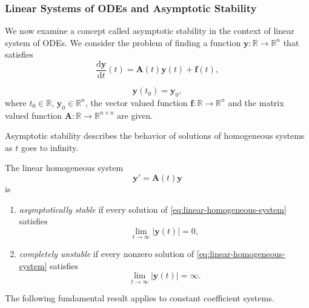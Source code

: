 \subsubsection{Linear Systems of ODEs and Asymptotic Stability}\label{subsec:linear-asymptotic-stability}

We now examine a concept called asymptotic stability in the context of linear system of ODEs. We consider the problem of finding a function $\bm{y}:\mathbb{R}\to\mathbb{R}^n$ that satisfies
\begin{equation}\label{eq:linear-nonhomogeneous-system}
\dfrac{\mathrm{d}\bm{y}}{\mathrm{d}t}(t)=\bm{A}(t)\bm{y}(t)+\bm{f}(t),
\end{equation}

\begin{equation}\label{eq:linear-system-initial-data}
\bm{y}(t_0)=\bm{y}_0,
\end{equation}
where $t_0\in\mathbb{R}$, $\bm{y}_0\in\mathbb{R}^n$, the vector valued function $\bm{f}:\mathbb{R}\to\mathbb{R}^n$ and the matrix valued function $\bm{A}:\mathbb{R}\to\mathbb{R}^{n\times n}$ are given.

Asymptotic stability describes the behavior of solutions of homogeneous systems as $t$ goes to infinity.

\begin{Definition}
\label{def:linear-system-asymptotic-stability}
The linear homogeneous system
\begin{equation}\label{eq:linear-homogeneous-system}
\bm{y}'=\bm{A}(t)\bm{y}
\end{equation}
is
\begin{enumerate}
\item \emph{asymptotically stable} if every solution of \eqref{eq:linear-homogeneous-system} satisfies
\begin{equation}\label{eq:asymptotic-stability-limit}
\lim_{t\to\infty}|\bm{y}(t)|=0,
\end{equation}

\item \emph{completely unstable} if every nonzero solution of \eqref{eq:linear-homogeneous-system} satisfies
\begin{equation}\label{eq:complete-instability-limit}
\lim_{t\to\infty}|\bm{y}(t)|=\infty.
\end{equation}
\end{enumerate}
\end{Definition}

The following fundamental result applies to constant coefficient systems.

